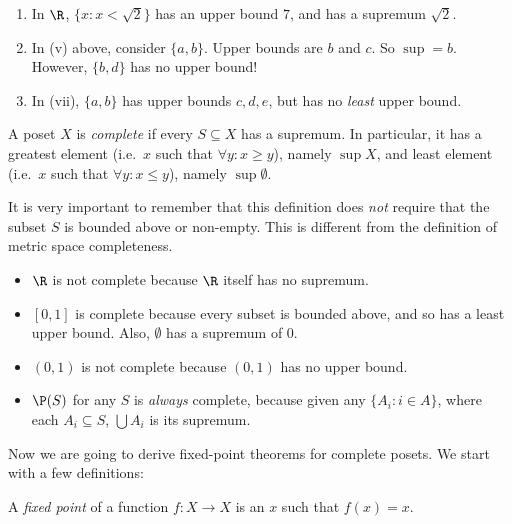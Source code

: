 \documentclass[a4paper]{article}
\begin{document}
\begin{eg}\leavevmode
  \begin{enumerate}
    \item In $\R$, $\{x: x < \sqrt{2}\}$ has an upper bound $7$, and has a supremum $\sqrt{2}$.

    \item In (v) above, consider $\{a, b\}$. Upper bounds are $b$ and $c$. So $\sup = b$. However, $\{b, d\}$ has no upper bound!
    \item In (vii), $\{a, b\}$ has upper bounds $c, d, e$, but has no \emph{least} upper bound.
  \end{enumerate}
\end{eg}

\begin{defi}
  A poset $X$ is \emph{complete} if every $S\subseteq X$ has a supremum. In particular, it has a greatest element (i.e.\ $x$ such that $\forall y: x \geq y$), namely $\sup X$, and least element (i.e.\ $x$ such that $\forall y: x \leq y$), namely $\sup \emptyset$.
\end{defi}
It is very important to remember that this definition does \emph{not} require that the subset $S$ is bounded above or non-empty. This is different from the definition of metric space completeness.

\begin{eg}\leavevmode
  \begin{itemize}
    \item $\R$ is not complete because $\R$ itself has no supremum.
    \item $[0, 1]$ is complete because every subset is bounded above, and so has a least upper bound. Also, $\emptyset$ has a supremum of $0$.
    \item $(0, 1)$ is not complete because $(0, 1)$ has no upper bound.
    \item $\P(S)$ for any $S$ is \emph{always} complete, because given any $\{A_i: i\in A\}$, where each $A_i\subseteq S$, $\bigcup A_i$ is its supremum.
  \end{itemize}
\end{eg}

Now we are going to derive fixed-point theorems for complete posets. We start with a few definitions:

\begin{defi}
  A \emph{fixed point} of a function $f:X\to X$ is an $x$ such that $f(x) = x$.
\end{defi}
\end{document}
